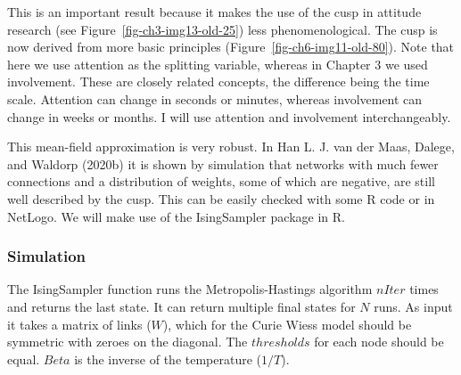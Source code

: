 \documentclass[
  a4paper,
  DIV=11,
  numbers=noendperiod]{scrreprt}
\begin{document}
This is an important result because it makes the use of the cusp in
attitude research (see Figure~\ref{fig-ch3-img13-old-25}) less
phenomenological. The cusp is now derived from more basic principles
(Figure~\ref{fig-ch6-img11-old-80}). Note that here we use attention as
the splitting variable, whereas in Chapter 3 we used involvement. These
are closely related concepts, the difference being the time scale.
Attention can change in seconds or minutes, whereas involvement can
change in weeks or months. I will use attention and involvement
interchangeably.

This mean-field approximation is very robust. In Han L. J. van der Maas,
Dalege, and Waldorp (2020b) it is shown by simulation that networks with
much fewer connections and a distribution of weights, some of which are
negative, are still well described by the cusp. This can be easily
checked with some R code or in NetLogo. We will make use of the
IsingSampler package in R.

\hypertarget{sec-Simulation}{%
\subsubsection{Simulation}\label{sec-Simulation}}

The IsingSampler function runs the Metropolis-Hastings algorithm
\(nIter\) times and returns the last state. It can return multiple final
states for \(N\) runs. As input it takes a matrix of links (\(W\)),
which for the Curie Wiess model should be symmetric with zeroes on the
diagonal. The \(thresholds\) for each node should be equal. \(Beta\) is
the inverse of the temperature (\(1/T\)).
\end{document}
